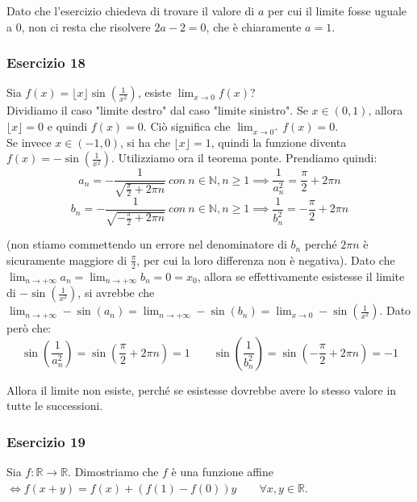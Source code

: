 \documentclass{article}
\begin{document}
\noindent Dato che l'esercizio chiedeva di trovare il valore di $a$ per cui il limite fosse uguale a $0$, non ci resta che risolvere $2a - 2 = 0$, che è chiaramente $a = 1$.

\subsubsection{Esercizio 18}
Sia $f(x) = \lfloor x \rfloor \sin(\frac{1}{x^2})$, esiste $\lim_{x \to 0} f(x)$?\\

\noindent Dividiamo il caso "limite destro" dal caso "limite sinistro". Se $x \in (0, 1)$, allora $\lfloor x \rfloor = 0$ e quindi $f(x) = 0$. Ciò significa che $\lim_{x \to 0^+} f(x) = 0$.\\
Se invece $x \in (-1, 0)$, si ha che $\lfloor x \rfloor = 1$, quindi la funzione diventa $f(x) = -\sin(\frac{1}{x^2})$. Utilizziamo ora il teorema ponte. Prendiamo quindi:
\begin{equation*}
    a_n = - \frac{1}{\sqrt{\frac{\pi}{2} + 2\pi n}} \ con \ n \in \mathbb{N}, n \geq 1 \implies \frac{1}{a_n^2} = \frac{\pi}{2} + 2\pi n
\end{equation*}
\begin{equation*}
    b_n = - \frac{1}{\sqrt{-\frac{\pi}{2} + 2\pi n}} \ con \ n \in \mathbb{N}, n \geq 1 \implies \frac{1}{b_n^2} = - \frac{\pi}{2} + 2\pi n
\end{equation*}

\noindent (non stiamo commettendo un errore nel denominatore di $b_n$ perché $2 \pi n$ è sicuramente maggiore di $\frac{\pi}{2}$, per cui la loro differenza non è negativa). Dato che $\lim_{n \to +\infty} a_n = \lim_{n \to +\infty} b_n = 0 = x_0$, allora se effettivamente esistesse il limite di $-\sin(\frac{1}{x^2})$, si avrebbe che $\lim_{n \to +\infty} -\sin(a_n) = \lim_{n \to +\infty} -\sin(b_n) = \lim_{x \to 0} -\sin(\frac{1}{x^2})$. Dato però che:
\begin{equation*}
    \sin\left(\frac{1}{a_n^2}\right) = \sin\left(\frac{\pi}{2} + 2\pi n\right) = 1 \qquad \sin\left(\frac{1}{b_n^2}\right) = \sin\left(-\frac{\pi}{2} + 2\pi n\right) = -1
\end{equation*}

\noindent Allora il limite non esiste, perché se esistesse dovrebbe avere lo stesso valore in tutte le successioni.

\subsubsection{Esercizio 19}
Sia $f: \mathbb{R} \xrightarrow{} \mathbb{R}$. Dimostriamo che $f$ è una funzione affine $\iff f(x + y) = f(x) + (f(1) - f(0))y \qquad \forall x, y \in \mathbb{R}$.\\
\end{document}

